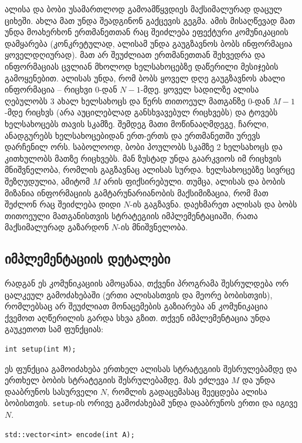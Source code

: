 \documentclass[12pt]{article}
\begin{document}
\renewcommand{\round}{Day 1}
\renewcommand{\problemName}{ამოცანა ციხე}
\renewcommand{\lang}{ქართული}

\renewcommand{\tl}{$2$ sec.}
\renewcommand{\ml}{$1024$ MB}
\problem{\problemName}

ალისა და ბობი უსამართლოდ გამოამწყვდიეს მაქსიმალურად დაცულ ციხეში. ახლა მათ უნდა შეადგინონ გაქცევის გეგმა. ამის მისაღწევად მათ უნდა მოახერხონ ერთმანეთთან რაც შეიძლება ეფექტური კომუნიკაციის დამყარება (კონკრეტულად, ალისამ უნდა გაუგზავნოს ბობს ინფორმაცია ყოველდღიურად). მათ არ შეუძლიათ ერთმანეთთან შეხვედრა და ინფორმაციას ცვლიან მხოლოდ ხელსახოცებზე დაწერილი მესიჯების გამოყენებით. ალისას უნდა, რომ ბობს ყოველ დღე გაუგზავნოს ახალი ინფორმაცია -- რიცხვი $0$-დან $N-1$-მდე. ყოველ სადილზე ალისა ღებულობს 3 ახალ ხელსახოცს და წერს თითოეულ მათგანზე $0$-დან $M-1$-მდე რიცხვს (არა აუცილებლად განსხვავებულ რიცხვებს) და ტოვებს ხელსახოცებს თავის სკამზე. შემდეგ მათი მოწინააღმდეგე, ჩარლი, ანადგურებს ხელსახოცებიდან ერთ-ერთს და ერთმანეთში ურევს დარჩენილ ორს. საბოლოოდ, ბობი პოულობს სკამზე 2 ხელსახოცს და კითხულობს მათზე რიცხვებს. მან ზუსტად უნდა გაარკვიოს იმ რიცხვის მნიშვნელობა, რომლის გაგზავნაც ალისას სურდა. ხელსახოცებზე სივრცე შეზღუდულია, ამიტომ  $M$ არის ფიქსირებული.  თუმცა, ალისას და ბობის მიზანია ინფორმაციის გამტარუნარიანობის მაქსიმიზაცია, რომ მათ შეძლონ რაც შეიძლება დიდი $N$-ის გაგზავნა. დაეხმარეთ ალისას და ბობს თითოეული მათგანისთვის სტრატეგიის იმპლემენტაციაში, რათა მაქსიმალურად გაზარდონ $N$-ის მნიშვნელობა.

\subsection{იმპლემენტაციის დეტალები}
რადგან ეს კომუნიკაციის ამოცანაა, თქვენი პროგრამა შესრულდება ორ ცალკეულ გამოძახებაში (ერთი ალისასთვის და მეორე ბობისთვის), რომლებსაც არ შეუძლიათ მონაცემების გაზიარება ან კომუნიკაცია ქვემოთ აღწერილის გარდა სხვა გზით. თქვენ იმპლემენტაცია უნდა გაუკეთოთ სამ ფუნქციას:

\begin{lstlisting}
int setup(int M);
\end{lstlisting}

ეს ფუნქცია გამოიძახება ერთხელ ალისას სტრატეგიის შესრულებამდე და ერთხელ ბობის სტრატეგიის შესრულებამდე. მას ეძლევა $M$ და უნდა დააბრუნოს სასურველი $N$, რომლის გადაცემასაც შეეცდება ალისა ბობისთვის. \texttt{setup}-ის ორივე გამოძახებამ უნდა დააბრუნოს ერთი და იგივე $N$.

\begin{lstlisting}
std::vector<int> encode(int A);
\end{lstlisting}
\end{document}
